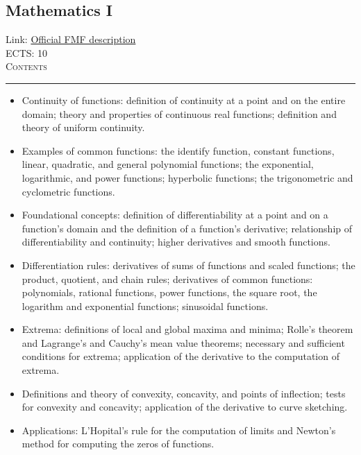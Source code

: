 \documentclass[11pt, a4paper]{article}
\newenvironment{course}[3]{
\subsection{#1}%
Link: \href{#2}{Official FMF description}\\%
ECTS: #3%
\vspace{1ex}
\\
{\large \textsc{Contents}}\\[-0.9ex]%
\rule{\textwidth}{0.5pt}
\vspace{-3ex}
}
{}
\newenvironment{chapter}[1]{
\begin{tcolorbox}[title=#1, breakable]
}
{\end{tcolorbox}}
\begin{document}
\begin{course}{Mathematics I}{https://www.fmf.uni-lj.si/en/study-physics/programmes/1fiz/2020/7000777/courses/520/}{10}
\begin{chapter}{Functions of a single variable}
\begin{itemize}
            \item Continuity of functions: definition of continuity at a point and on the entire domain; theory and properties of continuous real functions; definition and theory of uniform continuity.

            \item Examples of common functions:  the identify function, constant functions, linear, quadratic, and general polynomial functions; the exponential, logarithmic, and power functions; hyperbolic functions; the trigonometric and cyclometric functions.

        \end{itemize}
    \end{chapter}

    \begin{chapter}{Differential calculus}
        \begin{itemize}
        
            \item Foundational concepts: definition of differentiability at a point and on a function's domain and the definition of a function's derivative; relationship of differentiability and continuity; higher derivatives and smooth functions.

            \item Differentiation rules: derivatives of sums of functions and scaled functions; the product, quotient, and chain rules;
            derivatives of common functions: polynomials, rational functions, power functions, the square root, the logarithm and exponential functions; sinusoidal functions.

            \item Extrema: definitions of local and global maxima and minima;
            Rolle's theorem and Lagrange's and Cauchy's mean value theorems;
            necessary and sufficient conditions for extrema; application of the derivative to the computation of extrema.

            \item Definitions and theory of convexity, concavity, and points of inflection; tests for convexity and concavity; application of the derivative to curve sketching.

            \item Applications: L'Hopital's rule for the computation of limits and Newton's method for computing the zeros of functions.

        \end{itemize}
    \end{chapter}


\end{course}
\end{document}
